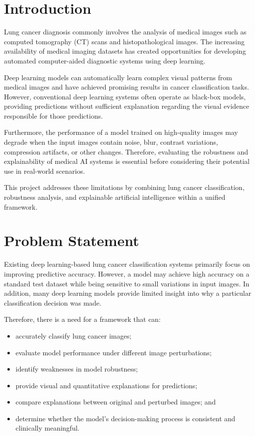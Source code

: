 \documentclass[12pt,a4paper]{article}
\begin{document}
\section{Introduction}

Lung cancer diagnosis commonly involves the analysis of medical images such as computed tomography (CT) scans and histopathological images. The increasing availability of medical imaging datasets has created opportunities for developing automated computer-aided diagnostic systems using deep learning.

Deep learning models can automatically learn complex visual patterns from medical images and have achieved promising results in cancer classification tasks. However, conventional deep learning systems often operate as black-box models, providing predictions without sufficient explanation regarding the visual evidence responsible for those predictions.

Furthermore, the performance of a model trained on high-quality images may degrade when the input images contain noise, blur, contrast variations, compression artifacts, or other changes. Therefore, evaluating the robustness and explainability of medical AI systems is essential before considering their potential use in real-world scenarios.

This project addresses these limitations by combining lung cancer classification, robustness analysis, and explainable artificial intelligence within a unified framework.

\section{Problem Statement}

Existing deep learning-based lung cancer classification systems primarily focus on improving predictive accuracy. However, a model may achieve high accuracy on a standard test dataset while being sensitive to small variations in input images. In addition, many deep learning models provide limited insight into why a particular classification decision was made.

Therefore, there is a need for a framework that can:

\begin{itemize}
    \item accurately classify lung cancer images;
    \item evaluate model performance under different image perturbations;
    \item identify weaknesses in model robustness;
    \item provide visual and quantitative explanations for predictions;
    \item compare explanations between original and perturbed images; and
    \item determine whether the model's decision-making process is consistent and clinically meaningful.
\end{itemize}
\end{document}
